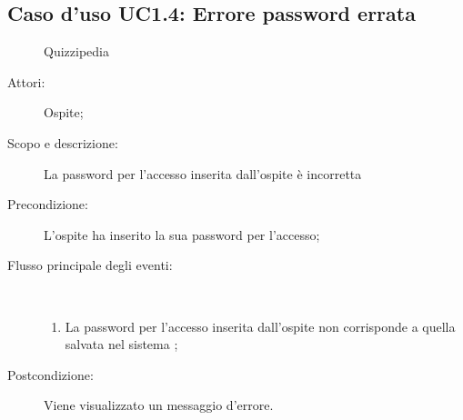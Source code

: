 \subsection{Caso d'uso UC1.4: Errore password errata}
	\begin{figure}[H]
		\centering
		\begin{resizedtikzpicture}{\textwidth}
		\begin{umlsystem}[x=0, fill=lightgray!20]{Quizzipedia}
		\end{umlsystem}
		\end{resizedtikzpicture}
		\caption{}
	\end{figure}
\begin{description}
\item[Attori:] Ospite;
\item[Scopo e descrizione:] La password per l'accesso inserita dall'ospite è incorretta
      \item[Precondizione:] L'ospite ha inserito la sua password per l'accesso;

        \item[Flusso principale degli eventi:] \ 
 \begin{enumerate}
          \item La password per l'accesso inserita dall'ospite non corrisponde a quella salvata nel sistema
;

      \end{enumerate}
    \item[Postcondizione:] Viene visualizzato un messaggio d'errore.
  \end{description}
\hypertarget{UC2}{}
